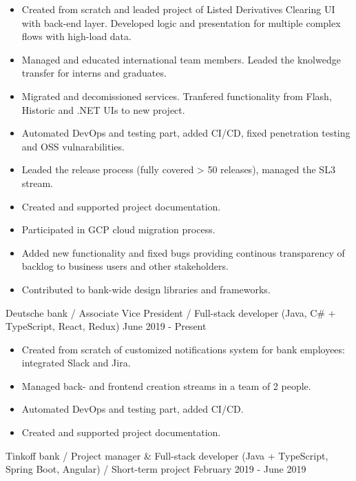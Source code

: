 

\vspace{0cm}\begin{cventries}
\cventry
{
\vspace{-0.4cm}
\begin{itemize}
\item Created from scratch and leaded project of Listed Derivatives Clearing UI with back-end layer. Developed logic and presentation for multiple complex flows with high-load data.
\item Managed and educated international team members. Leaded the knolwedge transfer for interns and graduates.
\item Migrated and decomissioned services. Tranfered functionality from Flash, Historic and .NET UIs to new project. 
\item Automated DevOps and testing part, added CI/CD, fixed penetration testing and OSS vulnarabilities. 
\item Leaded the release process (fully covered > 50 releases), managed the SL3 stream.
\item Created and supported project documentation.
\item Participated in GCP cloud migration process.
\item Added new functionality and fixed bugs providing continous transparency of backlog to business users and other stakeholders.
\item Contributed to bank-wide design libraries and frameworks.
\end{itemize}
} %
{Deutsche bank / Associate Vice President / Full-stack developer (Java, C\# + TypeScript, React, Redux)} %
{} %
{June 2019 - Present} %
\noindent	

\vspace{-0.4cm}
\cventry
{
\vspace{-0.4cm}
\begin{itemize}
\item Created from scratch of customized notifications system for bank employees: integrated Slack and Jira.
\item Managed back- and frontend creation streams in a team of 2 people.
\item Automated DevOps and testing part, added CI/CD. 
\item Created and supported project documentation.
\end{itemize}
} %
{Tinkoff bank / Project manager \& Full-stack developer (Java + TypeScript, Spring Boot, Angular) / Short-term project} %
{} %
{February 2019 - June 2019} %
\noindent	


\end{cventries}
